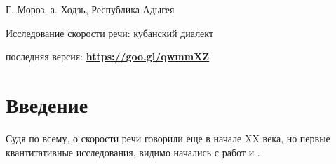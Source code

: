 

\begin{flushright}
	{\footnotesize Г. Мороз, а. Ходзь, Республика Адыгея}
\end{flushright}
\begin{center}{\Large Исследование скорости речи: кубанский диалект}
\end{center}
{\noindent\footnotesize последняя версия: \textbf{\href{https://goo.gl/qwmmXZ}{https://goo.gl/qwmmXZ}}}
\vspace{5mm}
\section{Введение}
\noindent Судя по всему, о скорости речи говорили еще в начале XX века, но первые квантитативные исследования, видимо начались с работ \citep{goldman54} и \citep{goldman56}.


